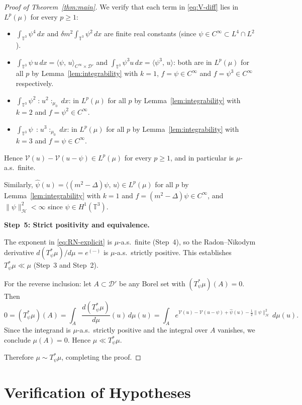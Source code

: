 \documentclass[11pt,a4paper]{article}
\theoremstyle{plain}
\theoremstyle{definition}
\newcommand{\T}{\mathbb{T}}
\newcommand{\cD}{\mathcal{D}}
\newcommand{\cH}{\mathcal{H}}
\newcommand{\cV}{\mathcal{V}}
\newcommand{\ip}[2]{\langle #1,\,#2\rangle}
\newcommand{\norm}[1]{\|#1\|}
\newcommand{\wick}[1]{\mathopen{:}\!#1\!\mathclose{:}}
\begin{document}
\begin{proof}[Proof of Theorem~\ref{thm:main}]
We verify that each term in \eqref{eq:V-diff} lies in $L^p(\mu)$ for every $p\ge1$:
\begin{itemize}
\item[(a)]
  $\int_{\T^3}\psi^4\,dx$ and $\delta m^2\int_{\T^3}\psi^2\,dx$ are finite real constants
  (since $\psi\in C^\infty\subset L^4\cap L^2$).
\item[(b)]
  $\int_{\T^3}\psi\,u\,dx = \ip{\psi}{u}_{C^\infty\times\cD'}$ and
  $\int_{\T^3}\psi^3 u\,dx = \ip{\psi^3}{u}$:
  both are in $L^p(\mu)$ for all $p$ by Lemma~\ref{lem:integrability}
  with $k=1$, $f=\psi\in C^\infty$ and $f=\psi^3\in C^\infty$ respectively.
\item[(c)]
  $\int_{\T^3}\psi^2\wick{u^2}_{\mu_0}\,dx$: in $L^p(\mu)$ for all $p$
  by Lemma~\ref{lem:integrability} with $k=2$ and $f=\psi^2\in C^\infty$.
\item[(d)]
  $\int_{\T^3}\psi\,\wick{u^3}_{\mu_0}\,dx$: in $L^p(\mu)$ for all $p$
  by Lemma~\ref{lem:integrability} with $k=3$ and $f=\psi\in C^\infty$.
\end{itemize}
Hence $\cV(u)-\cV(u-\psi)\in L^p(\mu)$ for every $p\ge1$,
and in particular is $\mu$-a.s.\ finite.

Similarly, $\hat\psi(u)=\ip{(m^2-\Delta)\psi}{u}\in L^p(\mu)$ for all $p$
by Lemma~\ref{lem:integrability} with $k=1$ and $f=(m^2-\Delta)\psi\in C^\infty$,
and $\norm\psi_\cH^2<\infty$ since $\psi\in H^1(\T^3)$.

\medskip\noindent
\textbf{Step~5: Strict positivity and equivalence.}

The exponent in \eqref{eq:RN-explicit} is $\mu$-a.s.\ finite (Step~4), so the
Radon--Nikodym derivative $d(T_\psi^*\mu)/d\mu = e^{(\cdots)}$ is $\mu$-a.s.\ strictly
positive.  This establishes $T_\psi^*\mu \ll \mu$ (Step~3 and Step~2).

For the reverse inclusion: let $A\subset\cD'$ be any Borel set with $(T_\psi^*\mu)(A)=0$.
Then
\[
  0 = (T_\psi^*\mu)(A)
    = \int_A \frac{d(T_\psi^*\mu)}{d\mu}(u)\,d\mu(u)
    = \int_A e^{\cV(u)-\cV(u-\psi)+\hat\psi(u)-\frac{1}{2}\norm\psi_\cH^2}\,d\mu(u).
\]
Since the integrand is $\mu$-a.s.\ strictly positive and the integral over $A$ vanishes,
we conclude $\mu(A)=0$.  Hence $\mu \ll T_\psi^*\mu$.

Therefore $\mu \sim T_\psi^*\mu$, completing the proof.
\end{proof}

\section{Verification of Hypotheses}
\end{document}
